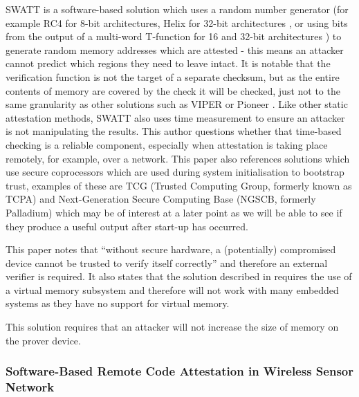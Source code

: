 SWATT \cite{Seshadri2004} is a software-based solution which uses a random number generator (for example RC4 for 8-bit architectures, Helix for 32-bit architectures \cite{Ferguson2003}, or using bits from the output of a multi-word T-function for 16 and 32-bit architectures \cite{Klimov2004}) to generate random memory addresses which are attested - this means an attacker cannot predict which regions they need to leave intact. It is notable that the verification function is not the target of a separate checksum, but as the entire contents of memory are covered by the check it will be checked, just not to the same granularity as other solutions such as VIPER \cite{Li2011} or Pioneer \cite{Seshadri2007}. Like other static attestation methods, SWATT also uses time measurement to ensure an attacker is not manipulating the results. This author questions whether that time-based checking is a reliable component, especially when attestation is taking place remotely, for example, over a network.
This paper also references solutions which use secure coprocessors which are used during system initialisation to bootstrap trust, examples of these are TCG (Trusted Computing Group, formerly known as TCPA) and Next-Generation Secure Computing Base (NGSCB, formerly Palladium) which may be of interest at a later point as we will be able to see if they produce a useful output after start-up has occurred.

This paper notes that ``without secure hardware, a (potentially) compromised device cannot be trusted to verify itself correctly'' and therefore an external verifier is required. It also states that the solution described in \cite{Kennell2003} requires the use of a virtual memory subsystem and therefore will not work with many embedded systems as they have no support for virtual memory.

This solution requires that an attacker will not increase the size of memory on the prover device. 


\subsubsection{Software-Based Remote Code Attestation in Wireless Sensor Network}

